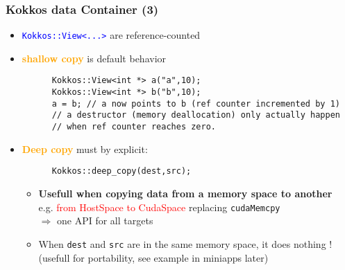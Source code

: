 \begin{frame}[fragile=singleslide]
  \frametitle{Kokkos data Container (3)}

  \begin{itemize}
  \item \textcolor{blue}{\texttt{Kokkos::View<...>}} are reference-counted
  \item \textcolor{orange}{\textbf{shallow copy}} is default behavior
    \begin{verbatim}
      Kokkos::View<int *> a("a",10);
      Kokkos::View<int *> b("b",10);
      a = b; // a now points to b (ref counter incremented by 1)
      // a destructor (memory deallocation) only actually happen
      // when ref counter reaches zero.
    \end{verbatim}
  \item \textcolor{orange}{\textbf{Deep copy}} must by explicit:
    \begin{verbatim}
      Kokkos::deep_copy(dest,src);
    \end{verbatim}
    \begin{itemize}
    \item \textbf{Usefull when copying data from a memory space to another}\\
      e.g. \textcolor{red}{from HostSpace to CudaSpace} replacing \texttt{cudaMemcpy}\\
      $\Rightarrow$ one API for all targets
    \item When \texttt{dest} and \texttt{src} are in the same memory space, it does nothing ! (usefull for portability, see example in miniapps later)
    \end{itemize}
  \end{itemize}

\end{frame}
